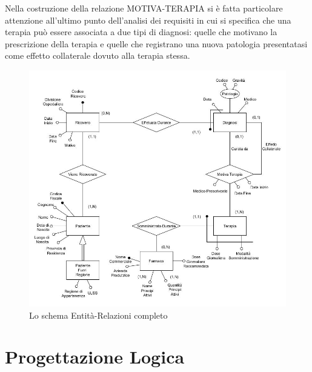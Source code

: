 \documentclass{article}
\begin{document}
Nella costruzione della relazione MOTIVA-TERAPIA si è fatta particolare attenzione
all'ultimo punto dell'analisi dei requisiti in cui si specifica che una terapia può 
essere associata a due tipi di diagnosi: quelle che motivano la prescrizione della
terapia e quelle che registrano una nuova patologia presentatasi come effetto 
collaterale dovuto alla terapia stessa. 


\begin{figure} %
    \centering
    \includegraphics[width=\linewidth]{schema1}
    \caption{Lo schema Entità-Relazioni completo}
    \label{schema_ER_progettazione_modello}
  \end{figure}






\clearpage
\section{Progettazione Logica}

\end{document}

